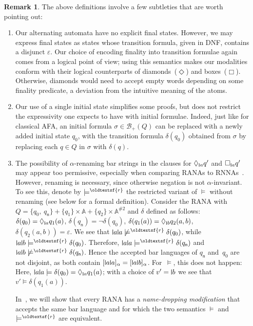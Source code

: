 \documentclass[10pt,a4paper]{amsart}
\theoremstyle{definition}
\newtheorem{rem}[theo]{Remark}
\renewcommand{\textsf}[1]{{\oldtextsf{\small#1}}}
\newcommand{\At}{\mathds{A}}
\newcommand{\allbool}{\mathcal{B}}
\newcommand{\posbool}{\allbool_+}
\newcommand{\negsym}{\mathsf{n}}
\newcommand{\negstate}[1]{#1_{\negsym}}
\newcommand{\rsem}{\vDash^{\textsf{r}}}
\newcommand{\names}{\At}
\newcommand{\set}[1]{\{#1\}}
\renewcommand{\vDash}{\models}
\newcommand{\midmid}{\hspace{0.2ex}{\rule[-0.1ex]{0.6pt}{1.65ex}}\hspace{0.2ex}}
\newcommand{\scriptmidmid}{\hspace{0.2ex}{\rule[-0.1ex]{0.6pt}{1.1ex}}\hspace{0.2ex}}
\newcommand{\newletter}[1]{{\midmid}#1}
\newcommand{\scriptnew}[1]{{\scriptmidmid}#1}
\begin{document}
\begin{rem}\label{ex:restrictedsemantics}
The above definitions involve a few subtleties that are worth pointing out:
  \begin{enumerate}
    \item\label{rem:ranadefn:6} Our alternating automata have no explicit final states.
      However, we may express final states as states whose transition formula, given in DNF, contains a disjunct $\varepsilon$.
      Our choice of encoding finality into transition formulae again comes from a logical point of view; using this semantics makes our modalities conform with their logical counterparts of diamonds~($\Diamond$) and boxes~($\Box$).
      Otherwise, diamonds would need to accept empty words depending on some finality predicate, a deviation from the intuitive meaning of the atoms. 
    \item Our use of a single initial state simplifies some proofs, but does not restrict the expressivity one expects to have with initial formulae.
      Indeed, just like for classical AFA, an initial formula $\sigma \in \posbool(Q)$ can be replaced with a newly added initial state $q_0$, with the transition
      formula $\delta(q_0)$ obtained from $\sigma$ by replacing each $q\in Q$ in $\sigma$ with $\delta(q)$.
    \item  The possibility of $\alpha$-renaming bar strings in the clauses for $\Diamond_{\scriptnew{a}} q'$ and $\Box_{\scriptnew{a}} q'$ may appear too permissive, especially when comparing RANAs
      to RNNAs~\cite{skmw17}. However, renaming is necessary, since otherwise negation is not $\alpha$-invariant. To see this, denote by $\rsem$ the restricted variant of $\models$ without renaming (see  below for a formal definition). Consider the RANA with 
      $Q = \set{q_0,\ \negstate{q}} + \set{q_1} \times \names + \set{q_2} \times \names^{\# 2}$ and $\delta$ defined
      as follows: $\delta(q_0) = \Diamond_{\scriptnew{a}} q_1(a)$, $\delta(\negstate{q}) = \neg\delta(q_0)$,
      $\delta(q_1(a)) = \Diamond_{\scriptnew{b}} q_2(a, b)$, $\delta(q_2(a, b)) = \varepsilon$. We see that $\newletter{a}\newletter{a} \not\rsem \delta(q_0)$, while $\newletter{a}\newletter{b} \rsem
      \delta(q_0)$. Therefore, $\newletter{a}\newletter{a} \rsem \delta(\negstate{q})$ and
      $\newletter{a}\newletter{b} \not\rsem \delta(\negstate{q})$. Hence the accepted bar languages of $\negstate{q}$
      and~$q_0$ are not disjoint, as both contain $[\newletter a \newletter a]_\alpha=[\newletter a \newletter b]_\alpha$. For~$\models$, this does not happen: Here, $\newletter{a}\newletter{a} \models \delta(q_0) =
      \Diamond_{\scriptnew{a}} q_1(a)$; with a choice of $v' = \newletter{b}$ we see that $v' \models
      \delta(q_1(a))$. 

      In~, we will show that every RANA has a \emph{name-dropping modification} that accepts the same bar language and for which the two semantics $\models$ and $\rsem$ are equivalent.
    \end{enumerate}
\end{rem}
\end{document}
